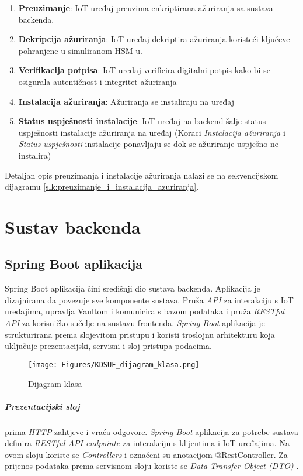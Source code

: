 \documentclass[zavrsnirad]{fer}
\begin{document}
	\begin{enumerate}
		\item \textbf{Preuzimanje}: IoT uređaj preuzima enkriptirana ažuriranja sa sustava backenda.
		\item \textbf{Dekripcija ažuriranja}: IoT uređaj dekriptira ažuriranja koristeći ključeve pohranjene u simuliranom HSM-u.
		\item \textbf {Verifikacija potpisa}: IoT uređaj verificira digitalni potpis kako bi se osigurala autentičnost i integritet ažuriranja
		\label{uspjeh_instalacije}
		\item \textbf {Instalacija ažuriranja}:  Ažuriranja se instaliraju na uređaj
		\label{instalacija}
		\item \textbf {Status uspješnosti instalacije}: IoT uređaj na backend šalje status uspješnosti instalacije ažuriranja na uređaj (Koraci \textit{Instalacija ažuriranja} i \textit{Status uspješnosti} instalacije ponavljaju se dok se ažuriranje uspješno ne instalira)
	\end{enumerate}
	
	Detaljan opis preuzimanja i instalacije ažuriranja nalazi se na sekvencijskom dijagramu \ref{slk:preuzimanje_i_instalacija_azuriranja}.
	
	
	
	
	\chapter{Sustav backenda}
	\label{pog:backend}
	\section{Spring Boot aplikacija}
	\label{backend:spring_boot}
	Spring Boot aplikacija čini središnji dio sustava backenda. Aplikacija je dizajnirana da povezuje sve komponente sustava. Pruža \textit{API} za interakciju s IoT uređajima, upravlja Vaultom i komunicira s bazom podataka i pruža \textit{RESTful API} za korisničko sučelje na sustavu frontenda. \textit{Spring Boot} aplikacija je strukturirana prema slojevitom pristupu i koristi troslojnu arhitekturu koja uključuje prezentacijski, servisni i sloj pristupa podacima. 
	
	\begin{figure}[htb]
		\centering
		\texttt{[image: Figures/KDSUF\_dijagram\_klasa.png]} 
		\caption{Dijagram klasa}
		\label{slk:dijagram_klasa}
	\end{figure}
	
	\paragraph{Prezentacijski sloj} prima \textit{HTTP} zahtjeve i vraća odgovore. \textit{Spring Boot} aplikacija za potrebe sustava definira \textit{RESTful API endpointe} za interakciju s klijentima i IoT uređajima. Na ovom sloju koriste se \textit{Controllers} i označeni su anotacijom @RestController. Za prijenos podataka prema servisnom sloju koriste se  \textit{Data Transfer Object (DTO)} .
	
\end{document}
